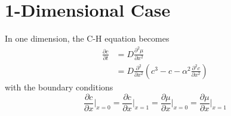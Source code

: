 \documentclass[]{article}
\theoremstyle{definition}
\numberwithin{equation}{section}
\numberwithin{equation}{section}
\begin{document}
	\section{1-Dimensional Case}
	In one dimension, the C-H equation becomes
	\begin{align}
		\frac{\partial c}{\partial t} &= D \frac{\partial ^2 \mu}{\partial x^2} \nonumber \\
		&=D \frac{\partial^2 }{\partial x^2} \left(c^3 - c - \alpha^2 \frac{\partial^2 c}{\partial x^2}\right) \label{eq:1d1}
	\end{align} 
	with the boundary conditions
	\begin{equation}
		\frac{\partial c}{\partial x} \bigg|_{x=0} = \frac{\partial c}{\partial x}\bigg|_{x = 1} = \frac{\partial \mu}{\partial x} \bigg| _{x=0} = \frac{\partial \mu}{\partial x} \bigg| _{x = 1} \label{eq:1dBC}
	\end{equation}
\end{document}
